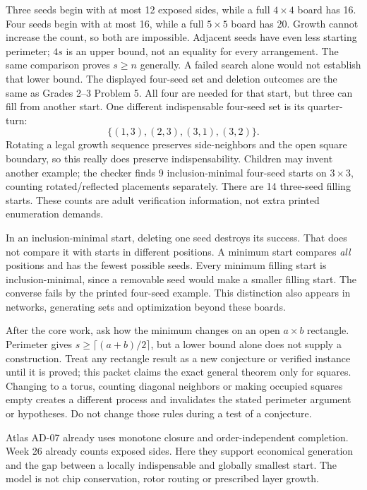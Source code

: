 Three seeds begin with at most 12 exposed sides, while a full $4\times4$ board has 16. Four seeds begin with at most 16, while a full $5\times5$ board has 20. Growth cannot increase the count, so both are impossible. Adjacent seeds have even less starting perimeter; $4s$ is an upper bound, not an equality for every arrangement. The same comparison proves $s\ge n$ generally. A failed search alone would not establish that lower bound.
\newpage
{}
The displayed four-seed set and deletion outcomes are the same as Grades 2--3 Problem 5. All four are needed for that start, but three can fill from another start. One different indispensable four-seed set is its quarter-turn:
\[
\{(1,3),(2,3),(3,1),(3,2)\}.
\]
Rotating a legal growth sequence preserves side-neighbors and the open square boundary, so this really does preserve indispensability. Children may invent another example; the checker finds 9 inclusion-minimal four-seed starts on $3\times3$, counting rotated/reflected placements separately. There are 14 three-seed filling starts. These counts are adult verification information, not extra printed enumeration demands.

In an inclusion-minimal start, deleting one seed destroys its success. That does not compare it with starts in different positions. A minimum start compares \emph{all} positions and has the fewest possible seeds. Every minimum filling start is inclusion-minimal, since a removable seed would make a smaller filling start. The converse fails by the printed four-seed example. This distinction also appears in networks, generating sets and optimization beyond these boards.

After the core work, ask how the minimum changes on an open $a\times b$ rectangle. Perimeter gives $s\ge\lceil(a+b)/2\rceil$, but a lower bound alone does not supply a construction. Treat any rectangle result as a new conjecture or verified instance until it is proved; this packet claims the exact general theorem only for squares. Changing to a torus, counting diagonal neighbors or making occupied squares empty creates a different process and invalidates the stated perimeter argument or hypotheses. Do not change those rules during a test of a conjecture.

Atlas AD-07 already uses monotone closure and order-independent completion. Week 26 already counts exposed sides. Here they support economical generation and the gap between a locally indispensable and globally smallest start. The model is not chip conservation, rotor routing or prescribed layer growth.

